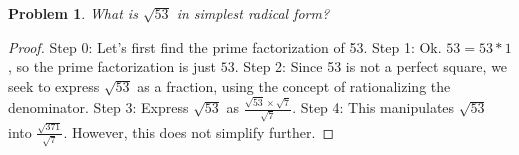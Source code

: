 \documentclass{article}
\newtheorem{theorem}{Problem}
\begin{document}
\begin{theorem}
What is $\sqrt{53}$ in simplest radical form?
\end{theorem}

\begin{proof}
Step 0: Let's first find the prime factorization of 53.
Step 1: Ok. $53 = 53 * 1$, so the prime factorization is just $53$.
Step 2: Since 53 is not a perfect square, we seek to express $\sqrt{53}$ as a fraction, using the concept of rationalizing the denominator.
Step 3: Express $\sqrt{53}$ as $\frac{\sqrt{53} \times \sqrt{7}}{\sqrt{7}}$.
Step 4: This manipulates $\sqrt{53}$ into $\frac{\sqrt{371}}{\sqrt{7}}$. However, this does not simplify further.
\end{proof}
\end{document}

